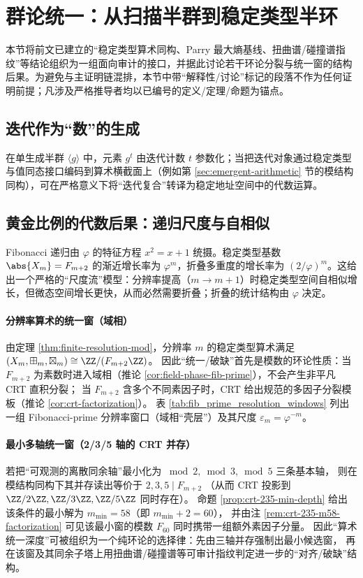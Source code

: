 \section{群论统一：从扫描半群到稳定类型半环}\label{sec:group-unification}

本节将前文已建立的“稳定类型算术同构、Parry 最大熵基线、扭曲谱/碰撞谱指纹”等结论组织为一组面向审计的接口，并据此讨论若干环论分裂与统一窗的结构后果。为避免与主证明链混排，本节中带“解释性/讨论”标记的段落不作为任何证明前提；凡涉及严格推导者均以已编号的定义/定理/命题为锚点。

\subsection{迭代作为“数”的生成}

在单生成半群 \(\langle g\rangle\) 中，元素 \(g^t\) 由迭代计数 \(t\) 参数化；当把迭代对象通过稳定类型与值同态接口编码到算术横截面上（例如第 \ref{sec:emergent-arithmetic} 节的模结构同构），可在严格意义下将“迭代复合”转译为稳定地址空间中的代数运算。

\subsection{黄金比例的代数后果：递归尺度与自相似}

Fibonacci 递归由 $\varphi$ 的特征方程 $x^2=x+1$ 统摄。稳定类型基数 $\abs{X_m}=F_{m+2}$ 的渐近增长率为 $\varphi^m$，折叠多重度的增长率为 $(2/\varphi)^m$。这给出一个严格的“尺度流”模型：分辨率提高（$m\to m+1$）时稳定类型空间自相似增长，但微态空间增长更快，从而必然需要折叠；折叠的统计结构由 $\varphi$ 决定。

\paragraph{分辨率算术的统一窗（域相）}
由定理 \ref{thm:finite-resolution-mod}，分辨率 $m$ 的稳定类型算术满足
\((X_m,\boxplus_m,\boxtimes_m)\cong \ZZ/(F_{m+2}\ZZ)\)。
因此“统一/破缺”首先是模数的环论性质：当 $F_{m+2}$ 为素数时进入域相（推论 \ref{cor:field-phase-fib-prime}），不会产生非平凡 CRT 直积分裂；
当 $F_{m+2}$ 含多个不同素因子时，CRT 给出规范的多因子分裂模板（推论 \ref{cor:crt-factorization}）。
表 \ref{tab:fib_prime_resolution_windows} 列出一组 Fibonacci-prime 分辨率窗口（域相“壳层”）及其尺度 $\varepsilon_m=\varphi^{-m}$。


\paragraph{最小多轴统一窗（2/3/5 轴的 CRT 并存）}
若把“可观测的离散同余轴”最小化为 \(\bmod 2,\bmod 3,\bmod 5\) 三条基本轴，
则在模结构同构下其并存读出等价于
\(
2,3,5\mid F_{m+2}
\)
（从而 CRT 投影到 \(\ZZ/2\ZZ,\ZZ/3\ZZ,\ZZ/5\ZZ\) 同时存在）。
命题 \ref{prop:crt-235-min-depth} 给出该条件的最小解为 \(m_{\min}=58\)（即 \(m_{\min}+2=60\)），
并由注 \ref{rem:crt-235-m58-factorization} 可见该最小窗的模数 \(F_{60}\) 同时携带一组额外素因子分量。
因此“算术统一深度”可被组织为一个纯环论的选择律：先由三轴并存强制出最小候选窗，
再在该窗及其同余子塔上用扭曲谱/碰撞谱等可审计指纹判定进一步的“对齐/破缺”结构。

